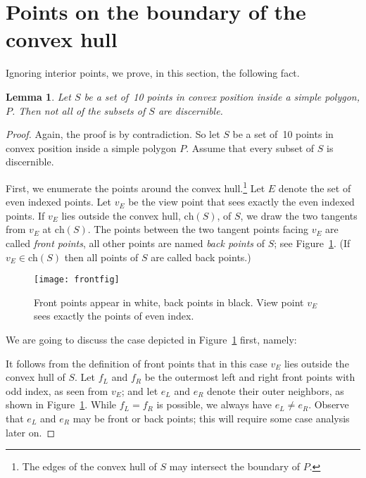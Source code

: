 \documentclass[11pt]{article}
\newtheorem{lemma}{Lemma}
\begin{document}
\bigskip
\section{Points on the boundary of the convex hull}         \label{outer-sec}Ignoring interior points, we prove, in this section, the following fact.

\begin{lemma}            \label{outer-lem}
Let $S$ be a set of~10 points in convex position inside a simple polygon, $P$. 
Then not all of the subsets of $S$ are discernible.
\end{lemma}
\begin{proof}
Again, the proof is by contradiction. So let $S$ be a set of~10 points
in convex position inside a simple polygon $P$. Assume that every subset of
$S$ is discernible.

First, we enumerate the points around the convex hull.\footnote{The edges of the convex hull of $S$ may intersect the boundary of $P$.
} 
Let $E$ denote the set of even indexed points. 
Let $v_E$ be the view point that sees exactly the even indexed points. If $v_E$ lies outside the convex hull, 
$\mbox{ch}(S)$, of $S$, we draw the 
two tangents from $v_E$ at $\mbox{ch}(S)$. The points between the two tangent points 
facing $v_E$ are called {\em front points}, all other
points are named  {\em back points} of $S$; see Figure~\ref{front-fig}.
(If $v_E \in \mbox{ch}(S)$ then all points of $S$ are called back points.)
 
 
\begin{figure}[htbp]\begin{center}\texttt{[image: frontfig]}\caption{Front points appear in white, back points in black. View point $v_E$
    sees exactly the points of even index.}\label{front-fig}
  \end{center}\end{figure}


We are going to discuss the case depicted in Figure~\ref{front-fig} first, namely:


It follows from the definition of front points that in this case $v_E$ lies outside the convex hull of $S$.
Let $f_L$ and $f_R$ be the outermost left and right front points with odd index, as seen from $v_E$;
and let $e_L$ and $e_R$ denote their outer neighbors, as shown in Figure~\ref{front-fig}.
While $f_L=f_R$ is possible, we always have $e_L \not= e_R$. Observe that $e_L$ and
$e_R$ may be front or back points; this will require some case analysis later on.


\end{proof}
\end{document}
